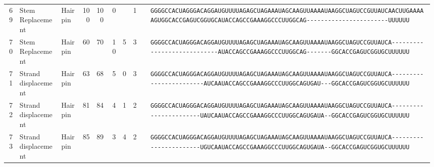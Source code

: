 \begin{tabular}{rllrrrrrcl}
 69 & Stem Replacement & Hairpin & 100 & 100 & 0 &  & 1 &  &
 \color{ucsfdarkgrey}\verb|GGGGCCACUAGGGACAGGAU|\color{ucsforange}\verb|GUUUUA|\color{ucsfblue}\verb|GAGCUAGAAAUAGCAAGU|\color{ucsforange}\verb|UAAAAUAA|\color{ucsfnavy}\verb|GGCUAGUCCGU|\color{ucsforange}\verb|UAUCA|\color{ucsfteal}\verb|ACUUGAAAAAGU|\color{ucsforange}\verb|GGCACCGAGUCGGUGC|\color{ucsfpurple}\verb|AUACCAGCCGAAAGGCCCUUGGCAG|\color{ucsforange}\verb|-----------------------UUUUUU| \\

 70 & Stem Replacement & Hairpin & 60 & 70 & 10 & 5 & 3 &  &
 \color{ucsfdarkgrey}\verb|GGGGCCACUAGGGACAGGAU|\color{ucsforange}\verb|GUUUUA|\color{ucsfblue}\verb|GAGCUAGAAAUAGCAAGU|\color{ucsforange}\verb|UAAAAUAA|\color{ucsfnavy}\verb|GGCUAGUCCGU|\color{ucsforange}\verb|UAUCA|\color{ucsfteal}\verb|----------------------------|\color{ucsfpurple}\verb|AUACCAGCCGAAAGGCCCUUGGCAG|\color{ucsfteal}\verb|-------|\color{ucsforange}\verb|GGCACCGAGUCGGUGCUUUUUU| \\

 71 & Strand displacement & Hairpin & 63 & 68 & 5 & 0 & 3 &  &
 \color{ucsfdarkgrey}\verb|GGGGCCACUAGGGACAGGAU|\color{ucsforange}\verb|GUUUUA|\color{ucsfblue}\verb|GAGCUAGAAAUAGCAAGU|\color{ucsforange}\verb|UAAAAUAA|\color{ucsfnavy}\verb|GGCUAGUCCGU|\color{ucsforange}\verb|UAUCA|\color{ucsfteal}\verb|------------------------AUCA|\color{ucsfpurple}\verb|AUACCAGCCGAAAGGCCCUUGGCAG|\color{ucsfteal}\verb|UGAU---|\color{ucsforange}\verb|GGCACCGAGUCGGUGCUUUUUU| \\

 72 & Strand displacement & Hairpin & 81 & 84 & 4 & 1 & 2 &  &
 \color{ucsfdarkgrey}\verb|GGGGCCACUAGGGACAGGAU|\color{ucsforange}\verb|GUUUUA|\color{ucsfblue}\verb|GAGCUAGAAAUAGCAAGU|\color{ucsforange}\verb|UAAAAUAA|\color{ucsfnavy}\verb|GGCUAGUCCGU|\color{ucsforange}\verb|UAUCA|\color{ucsfteal}\verb|-----------------------UAUCA|\color{ucsfpurple}\verb|AUACCAGCCGAAAGGCCCUUGGCAG|\color{ucsfteal}\verb|UGAUA--|\color{ucsforange}\verb|GGCACCGAGUCGGUGCUUUUUU| \\

 73 & Strand displacement & Hairpin & 85 & 89 & 3 & 4 & 2 &  &
 \color{ucsfdarkgrey}\verb|GGGGCCACUAGGGACAGGAU|\color{ucsforange}\verb|GUUUUA|\color{ucsfblue}\verb|GAGCUAGAAAUAGCAAGU|\color{ucsforange}\verb|UAAAAUAA|\color{ucsfnavy}\verb|GGCUAGUCCGU|\color{ucsforange}\verb|UAUCA|\color{ucsfteal}\verb|-----------------------UGUCA|\color{ucsfpurple}\verb|AUACCAGCCGAAAGGCCCUUGGCAG|\color{ucsfteal}\verb|UGAUA--|\color{ucsforange}\verb|GGCACCGAGUCGGUGCUUUUUU| \\


\end{tabular}
